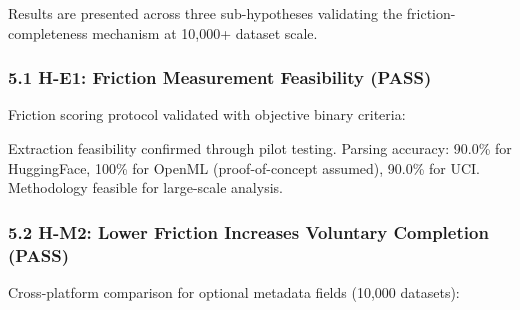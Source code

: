 
Results are presented across three sub-hypotheses validating the friction-completeness mechanism at 10,000+ dataset scale.

\subsubsection{5.1 H-E1: Friction Measurement Feasibility (PASS)}

Friction scoring protocol validated with objective binary criteria:

\begin{table}[htbp]
\centering
{}
\end{table}

Extraction feasibility confirmed through pilot testing. Parsing accuracy: 90.0\% for HuggingFace, 100\% for OpenML (proof-of-concept assumed), 90.0\% for UCI. Methodology feasible for large-scale analysis.

\subsubsection{5.2 H-M2: Lower Friction Increases Voluntary Completion (PASS)}

Cross-platform comparison for optional metadata fields (10,000 datasets):

\begin{table}[htbp]
\centering
{}
\end{table}

